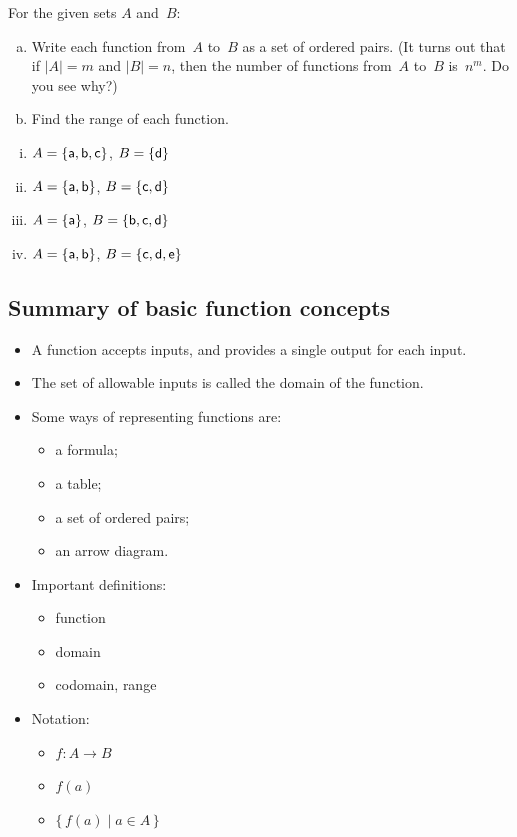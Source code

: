 \begin{exercise}{27}
 For the given sets $A$ and~$B$:
\begin{enumerate}[(a)] 
\item Write each function from~$A$ to~$B$ as a set of ordered pairs. (It turns out that if $|A| = m$
and $|B| = n$, then the number of functions from~$A$ to~$B$ is~$n^m$. Do you see why?)
\item Find the range of each function.
\end{enumerate}
\begin{multicols}{2}
\begin{enumerate}[i.]
\item \label{FunctionsChapExers-FindAll-abc,d}
$A = \{\sf{a},\sf{b},\sf{c}\}$, $B = \{\sf{d}\}$
\item \label{FunctionsChapExers-FindAll-ab,cd}
$A = \{\sf{a},\sf{b}\}$, $B = \{\sf{c},\sf{d}\}$
\item \label{FunctionsChapExers-FindAll-a,bcd}
$A = \{\sf{a}\}$, $B = \{\sf{b},\sf{c},\sf{d}\}$
\item \label{FunctionsChapExers-FindAll-ab,cde}
$A = \{\sf{a},\sf{b}\}$, $B = \{\sf{c},\sf{d},\sf{e}\}$
\end{enumerate}
\end{multicols}
\end{exercise}

\subsection{Summary of basic function concepts}
\begin{itemize}
\item A function accepts inputs, and provides a single output for each input.
\item The set of allowable inputs is called the domain of the function.
\item Some ways of representing functions are:
\begin{itemize}
\item a formula;
\item a table;
\item a set of ordered pairs;
\item an arrow diagram.
\end{itemize}
\item Important definitions:
\begin{itemize}
\item function
\item domain
\item codomain, range
\end{itemize}
\item Notation: 
\begin{itemize}
\item $f \colon A \to B$
\item $f(a)$
\item $\{\, f(a) \mid a \in A \,\}$
\end{itemize}
\end{itemize}


